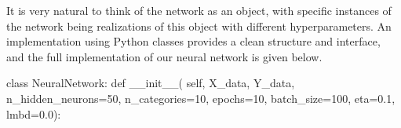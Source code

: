 \documentclass[%
oneside,                 %
final,                   %
10pt]{article}
\begin{document}
It is very natural to think of the network as an object, with specific instances of the network
being realizations of this object with different hyperparameters. An implementation using Python classes provides a clean structure and interface, and the full implementation of our neural network is given below.





































































































\bpycod
class NeuralNetwork:
    def __init__(
            self,
            X_data,
            Y_data,
            n_hidden_neurons=50,
            n_categories=10,
            epochs=10,
            batch_size=100,
            eta=0.1,
            lmbd=0.0):
\end{document}
